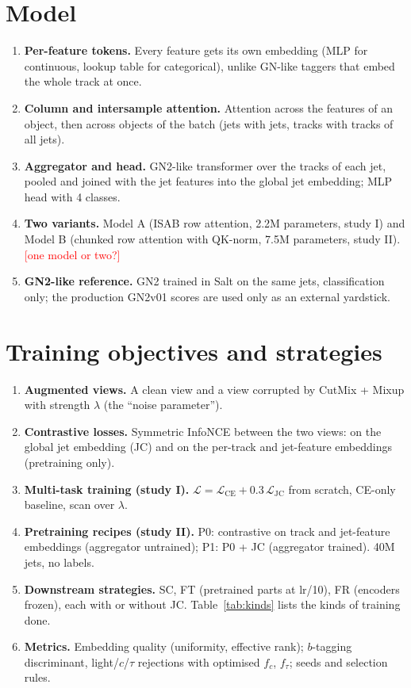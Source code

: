 \documentclass[11pt,a4paper]{article}
\newcommand{\open}[1]{\textcolor{red}{[#1]}}
\begin{document}
\section{Model}
\begin{enumerate}
  \item \textbf{Per-feature tokens.} Every feature gets its own embedding (MLP for continuous,
        lookup table for categorical), unlike GN-like taggers that embed the whole track at once.
  \item \textbf{Column and intersample attention.} Attention across the features of an object,
        then across objects of the batch (jets with jets, tracks with tracks of all jets).
  \item \textbf{Aggregator and head.} GN2-like transformer over the tracks of each jet, pooled and
        joined with the jet features into the global jet embedding; MLP head with 4 classes.
  \item \textbf{Two variants.} Model A (ISAB row attention, 2.2M parameters, study I) and Model B
        (chunked row attention with QK-norm, 7.5M parameters, study II). \open{one model or two?}
  \item \textbf{GN2-like reference.} GN2 trained in Salt on the same jets, classification only;
        the production GN2v01 scores are used only as an external yardstick.
\end{enumerate}

\section{Training objectives and strategies}
\begin{enumerate}
  \item \textbf{Augmented views.} A clean view and a view corrupted by CutMix + Mixup with
        strength $\lambda$ (the ``noise parameter'').
  \item \textbf{Contrastive losses.} Symmetric InfoNCE between the two views: on the global jet
        embedding (JC) and on the per-track and jet-feature embeddings (pretraining only).
  \item \textbf{Multi-task training (study I).} $\mathcal{L}=\mathcal{L}_\mathrm{CE}+0.3\,\mathcal{L}_\mathrm{JC}$
        from scratch, CE-only baseline, scan over $\lambda$.
  \item \textbf{Pretraining recipes (study II).} P0: contrastive on track and jet-feature
        embeddings (aggregator untrained); P1: P0 + JC (aggregator trained). 40M jets, no labels.
  \item \textbf{Downstream strategies.} SC, FT (pretrained parts at lr/10), FR (encoders frozen),
        each with or without JC. Table~\ref{tab:kinds} lists the kinds of training done.
  \item \textbf{Metrics.} Embedding quality (uniformity, effective rank); $b$-tagging
        discriminant, light/$c$/$\tau$ rejections with optimised $f_c$, $f_\tau$; seeds and
        selection rules.
\end{enumerate}
\end{document}
